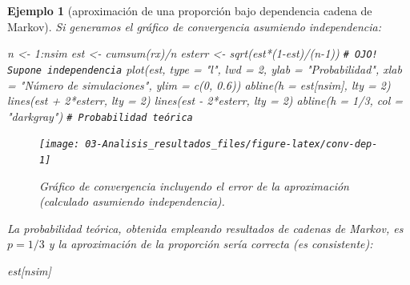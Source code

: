 \documentclass[
  10pt,
]{book}
\newenvironment{Shaded}{\begin{snugshade}}{\end{snugshade}}
\newcommand{\AttributeTok}[1]{\textcolor[rgb]{0.77,0.63,0.00}{#1}}
\newcommand{\CommentTok}[1]{\textcolor[rgb]{0.56,0.35,0.01}{\textit{#1}}}
\newcommand{\DecValTok}[1]{\textcolor[rgb]{0.00,0.00,0.81}{#1}}
\newcommand{\FloatTok}[1]{\textcolor[rgb]{0.00,0.00,0.81}{#1}}
\newcommand{\FunctionTok}[1]{\textcolor[rgb]{0.00,0.00,0.00}{#1}}
\newcommand{\NormalTok}[1]{#1}
\newcommand{\OtherTok}[1]{\textcolor[rgb]{0.56,0.35,0.01}{#1}}
\newcommand{\SpecialCharTok}[1]{\textcolor[rgb]{0.00,0.00,0.00}{#1}}
\newcommand{\StringTok}[1]{\textcolor[rgb]{0.31,0.60,0.02}{#1}}
\theoremstyle{break}
\newtheorem{example}{Ejemplo}[chapter]
\theoremstyle{nonumberplain}
\renewcommand{\CommentTok}[1]{\textcolor[rgb]{0.41,0.41,0.41}{\texttt{#1}}}
\begin{document}
\begin{example}[aproximación de una proporción bajo dependencia cadena de Markov]
Si generamos el gráfico de convergencia asumiendo independencia:

\begin{Shaded}
\begin{Highlighting}[]
\NormalTok{n }\OtherTok{\textless{}{-}} \DecValTok{1}\SpecialCharTok{:}\NormalTok{nsim}
\NormalTok{est }\OtherTok{\textless{}{-}} \FunctionTok{cumsum}\NormalTok{(rx)}\SpecialCharTok{/}\NormalTok{n}
\NormalTok{esterr }\OtherTok{\textless{}{-}} \FunctionTok{sqrt}\NormalTok{(est}\SpecialCharTok{*}\NormalTok{(}\DecValTok{1}\SpecialCharTok{{-}}\NormalTok{est)}\SpecialCharTok{/}\NormalTok{(n}\DecValTok{{-}1}\NormalTok{)) }\CommentTok{\# OJO! Supone independencia}
\FunctionTok{plot}\NormalTok{(est, }\AttributeTok{type =} \StringTok{"l"}\NormalTok{, }\AttributeTok{lwd =} \DecValTok{2}\NormalTok{, }\AttributeTok{ylab =} \StringTok{"Probabilidad"}\NormalTok{, }
     \AttributeTok{xlab =} \StringTok{"Número de simulaciones"}\NormalTok{, }\AttributeTok{ylim =} \FunctionTok{c}\NormalTok{(}\DecValTok{0}\NormalTok{, }\FloatTok{0.6}\NormalTok{))}
\FunctionTok{abline}\NormalTok{(}\AttributeTok{h =}\NormalTok{ est[nsim], }\AttributeTok{lty =} \DecValTok{2}\NormalTok{)}
\FunctionTok{lines}\NormalTok{(est }\SpecialCharTok{+} \DecValTok{2}\SpecialCharTok{*}\NormalTok{esterr, }\AttributeTok{lty =} \DecValTok{2}\NormalTok{) }
\FunctionTok{lines}\NormalTok{(est }\SpecialCharTok{{-}} \DecValTok{2}\SpecialCharTok{*}\NormalTok{esterr, }\AttributeTok{lty =} \DecValTok{2}\NormalTok{)}
\FunctionTok{abline}\NormalTok{(}\AttributeTok{h =} \DecValTok{1}\SpecialCharTok{/}\DecValTok{3}\NormalTok{, }\AttributeTok{col =} \StringTok{"darkgray"}\NormalTok{) }\CommentTok{\# Probabilidad teórica}
\end{Highlighting}
\end{Shaded}

\begin{figure}[!htbp]

{\centering \texttt{[image: 03-Analisis\_resultados\_files/figure-latex/conv-dep-1]} 

}

\caption{Gráfico de convergencia incluyendo el error de la aproximación (calculado asumiendo independencia).}\label{fig:conv-dep}
\end{figure}

La probabilidad teórica, obtenida empleando resultados de cadenas de Markov, es \(p = 1/3\) y la aproximación de la proporción sería correcta (es consistente):

\begin{Shaded}
\begin{Highlighting}[]
\NormalTok{est[nsim]}
\end{Highlighting}
\end{Shaded}


\end{example}
\end{document}
